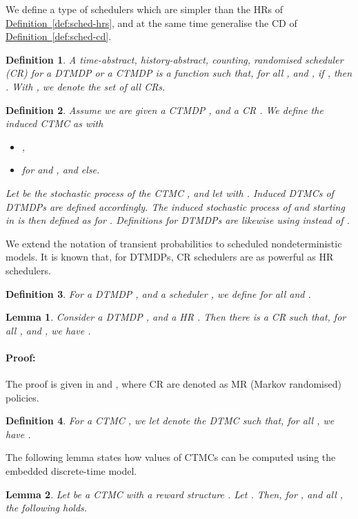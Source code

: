 \documentclass[10pt,twocolumn]{article}
\newenvironment{proof}{\paragraph{Proof:}}{\hfill}
\newtheorem{definition}{Definition}
\newtheorem{lemma}{Lemma}
\newcommand{\refdef}[1]{\texorpdfstring{\hyperref[def:#1]{Definition~\ref*{def:#1}}}{Definition \ref*{def:#1}}}
\begin{document}
We define a type of schedulers which are simpler than the HRs of \refdef{sched-hrs}, and at the same time generalise the CD of \refdef{sched-cd}.
\begin{definition}
  \label{def:sched-cr}
A \emph{time-abstract, history-abstract, counting, randomised scheduler (CR)} for a DTMDP  or a CTMDP  is a function 
  such that, for all , and , if , then .
  With  , we denote the set of all CRs.
\end{definition}

\begin{definition}
  \label{def:induced}
Assume we are given a CTMDP , and a CR
  . We define the \emph{induced CTMC} as  with
\begin{itemize}
  \item ,
  \item  for  and , and  else.
  \end{itemize}
Let  be the stochastic process of the CTMC , and let  with .
  Induced DTMCs of DTMDPs are defined accordingly.
  The \emph{induced stochastic process}  of  and  starting in  is then defined as  for .
  Definitions for DTMDPs are likewise using  instead of .
\end{definition}

We extend the notation of transient probabilities to scheduled nondeterministic models.
It is known that, for DTMDPs, CR schedulers are as powerful as HR schedulers.
\begin{definition}
  For a DTMDP , and a scheduler ,
  we define  for all  and .
\end{definition}

\begin{lemma}
  \label{lem:cr-suffices-dt}
Consider a DTMDP , and a HR .
  Then there is a CR  such that, for all , and ,
  we have .
\end{lemma}
\begin{proof}
The proof is given in \cite{Strauch66} and \cite[Theorem 5.5.1]{Puterman94}, where CR are denoted as MR (Markov randomised) policies.
\end{proof}

\begin{definition}
  For a CTMC , we let  denote the DTMC
  such that, for all , we have .
\end{definition}

The following lemma states how values of CTMCs can be computed using the embedded discrete-time model.
\begin{lemma}
  \label{lem:disc-rew}
Let  be a CTMC with a reward structure .
  Let .
  Then, for , and all , the following holds.
  
\end{lemma}
\end{document}
